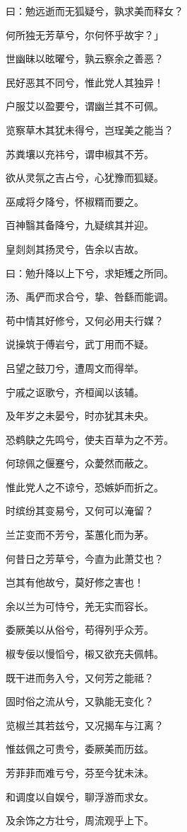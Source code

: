 \documentclass[12pt,a4paper]{ctexbook}
\begin{document}
曰：勉远逝而无狐疑兮，孰求美而释女？\par
何所独无芳草兮，尔何怀乎故宇？」\par
世幽昧以昡曜兮，孰云察余之善恶？\par
民好恶其不同兮，惟此党人其独异！\par
户服艾以盈要兮，谓幽兰其不可佩。\par
览察草木其犹未得兮，岂珵美之能当？\par
苏粪壤以充祎兮，谓申椒其不芳。\par
欲从灵氛之吉占兮，心犹豫而狐疑。\par
巫咸将夕降兮，怀椒糈而要之。\par
百神翳其备降兮，九疑缤其并迎。\par
皇剡剡其扬灵兮，告余以吉故。\par
曰：勉升降以上下兮，求矩矱之所同。\par
汤、禹俨而求合兮，挚、咎繇而能调。\par
苟中情其好修兮，又何必用夫行媒？\par
说操筑于傅岩兮，武丁用而不疑。\par
吕望之鼓刀兮，遭周文而得举。\par
宁戚之讴歌兮，齐桓闻以该辅。\par
及年岁之未晏兮，时亦犹其未央。\par
恐鹈鴃之先鸣兮，使夫百草为之不芳。\par
何琼佩之偃蹇兮，众薆然而蔽之。\par
惟此党人之不谅兮，恐嫉妒而折之。\par
时缤纷其变易兮，又何可以淹留？\par
兰芷变而不芳兮，荃蕙化而为茅。\par
何昔日之芳草兮，今直为此萧艾也？\par
岂其有他故兮，莫好修之害也！\par
余以兰为可恃兮，羌无实而容长。\par
委厥美以从俗兮，苟得列乎众芳。\par
椒专佞以慢慆兮，樧又欲充夫佩帏。\par
既干进而务入兮，又何芳之能祗？\par
固时俗之流从兮，又孰能无变化？\par
览椒兰其若兹兮，又况揭车与江离？\par
惟兹佩之可贵兮，委厥美而历兹。\par
芳菲菲而难亏兮，芬至今犹未沬。\par
和调度以自娱兮，聊浮游而求女。\par
及余饰之方壮兮，周流观乎上下。\par
\end{document}
